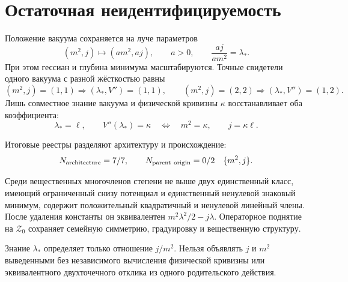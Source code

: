\section{Остаточная неидентифицируемость}

Положение вакуума сохраняется на луче параметров
\begin{equation}
 (m^2,j)\longmapsto(am^2,aj),
 \qquad a>0,
 \qquad \frac{aj}{am^2}=\lambda_*.
 \label{eq:v8-baryon-c0-central-gap-source-parameter-orbit}
\end{equation}
При этом гессиан и глубина минимума масштабируются. Точные свидетели
одного вакуума с разной жёсткостью равны
\begin{equation}
 (m^2,j)=(1,1)\Longrightarrow(\lambda_*,V'')=(1,1),
 \qquad
 (m^2,j)=(2,2)\Longrightarrow(\lambda_*,V'')=(1,2).
 \label{eq:v8-baryon-c0-central-gap-source-same-vacuum-witnesses}
\end{equation}
Лишь совместное знание вакуума и физической кривизны $\kappa$ восстанавливает
оба коэффициента:
\begin{equation}
 \lambda_*=\ell,
 \qquad V''(\lambda_*)=\kappa
 \quad\Longleftrightarrow\quad
 m^2=\kappa,
 \qquad j=\kappa\ell.
 \label{eq:v8-baryon-c0-central-gap-source-vacuum-curvature-reconstruction}
\end{equation}

Итоговые реестры разделяют архитектуру и происхождение:
\begin{equation}
 N_{\rm architecture}=7/7,
 \qquad
 N_{\rm parent\ origin}=0/2\quad\{m^2,j\}.
 \label{eq:v8-baryon-c0-central-gap-source-ledgers}
\end{equation}

\begin{theorem}
Среди вещественных многочленов степени не выше двух единственный класс,
имеющий ограниченный снизу потенциал и единственный ненулевой знаковый
минимум, содержит положительный квадратичный и ненулевой линейный члены.
После удаления константы он эквивалентен $m^2\lambda^2/2-j\lambda$.
Операторное поднятие на $\mathcal Z_0$ сохраняет семейную симметрию,
градуировку и вещественную структуру.
\end{theorem}

\begin{nogocriterion}
Знание $\lambda_*$ определяет только отношение $j/m^2$. Нельзя объявлять
$j$ и $m^2$ выведенными без независимого вычисления физической кривизны
или эквивалентного двухточечного отклика из одного родительского действия.
\end{nogocriterion}

